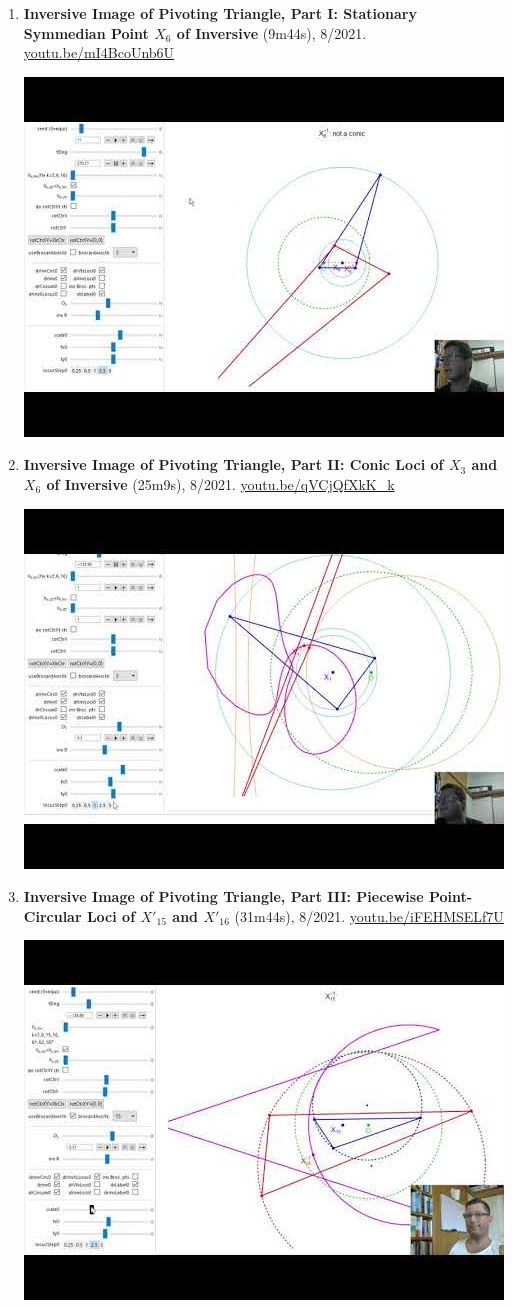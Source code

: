 \documentclass[12pt]{article}
\begin{document}
\begin{enumerate}[resume]
% 
\item \textbf{Inversive Image of Pivoting Triangle, Part I: Stationary Symmedian Point $X_{6}$ of Inversive} (9m44s), 8/2021. \href{https://youtu.be/mI4BcoUnb6U}{\url{youtu.be/mI4BcoUnb6U}}
\begin{center}\includegraphics[width=.5\textwidth]{pics/mI4BcoUnb6U.jpg}\end{center}
% 
\item \textbf{Inversive Image of Pivoting Triangle, Part II: Conic Loci of $X_{3}$ and $X_{6}$ of Inversive} (25m9s), 8/2021. \href{https://youtu.be/qVCjQfXkK_k}{\url{youtu.be/qVCjQfXkK\_k}}
\begin{center}\includegraphics[width=.5\textwidth]{pics/qVCjQfXkK_k.jpg}\end{center}
% 
\item \textbf{Inversive Image of Pivoting Triangle, Part III: Piecewise Point-Circular Loci of $X'_{15}$ and $X'_{16}$} (31m44s), 8/2021. \href{https://youtu.be/iFEHMSELf7U}{\url{youtu.be/iFEHMSELf7U}}
\begin{center}\includegraphics[width=.5\textwidth]{pics/iFEHMSELf7U.jpg}\end{center}

\end{enumerate}
\end{document}
